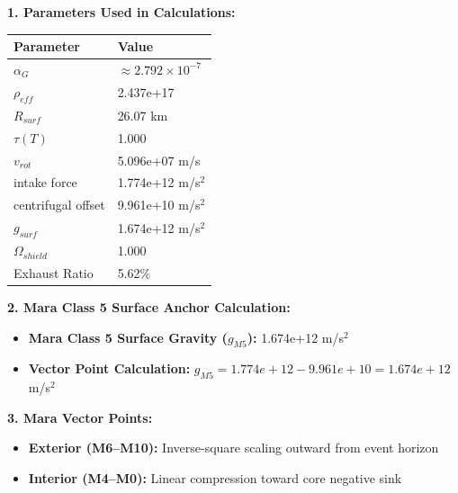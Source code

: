 \documentclass[11pt, a4paper]{article}
\begin{document}
\vspace{0.5em}
\noindent \textbf{1. Parameters Used in Calculations:}
\begin{center}
  \begin{tabular}{|l|l|}
    \hline
    \textbf{Parameter} & \textbf{Value} \\ \hline
    $\alpha_G$ & $\approx 2.792 \times 10^{-7}$ \\ \hline
    $\rho_{eff}$ & 2.437e+17 \\ \hline
    $R_{surf}$ & 26.07 km \\ \hline
    $\tau(T)$ & 1.000 \\ \hline
    $v_{rot}$ & 5.096e+07 m/s \\ \hline
    intake force & 1.774e+12 m/s$^2$ \\ \hline
    centrifugal offset & 9.961e+10 m/s$^2$ \\ \hline
    $g_{surf}$ & 1.674e+12 m/s$^2$ \\ \hline
    $\Omega_{shield}$ & 1.000 \\ \hline
    Exhaust Ratio & 5.62\% \\ \hline
  \end{tabular}
\end{center}

\vspace{0.5em}
\noindent \textbf{2. Mara Class 5 Surface Anchor Calculation:}
\begin{itemize}
  \item \textbf{Mara Class 5 Surface Gravity ($g_{M5}$):} 1.674e+12 m/s$^2$
  \item \textbf{Vector Point Calculation:} $g_{M5} = 1.774e+12 - 9.961e+10 = 1.674e+12$ m/s$^2$
\end{itemize}

\vspace{0.5em}
\noindent \textbf{3. Mara Vector Points:}
\begin{itemize}
  \item \textbf{Exterior (M6--M10):} Inverse-square scaling outward from event horizon
  \item \textbf{Interior (M4--M0):} Linear compression toward core negative sink
\end{itemize}
\end{document}
